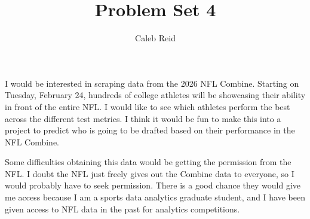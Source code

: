 \documentclass{article}
\title{Problem Set 4}
\author{Caleb Reid}
\begin{document}
    
\maketitle

I would be interested in scraping data from the 2026 NFL Combine. Starting on Tuesday, February 24, hundreds of college athletes will be showcasing their ability in front of the entire NFL. I would like to see which athletes perform the best across the different test metrics. I think it would be fun to make this into a project to predict who is going to be drafted based on their performance in the NFL Combine.

Some difficulties obtaining this data would be getting the permission from the NFL. I doubt the NFL just freely gives out the Combine data to everyone, so I would probably have to seek permission. There is a good chance they would give me access because I am a sports data analytics graduate student, and I have been given access to NFL data in the past for analytics competitions.
\end{document}
